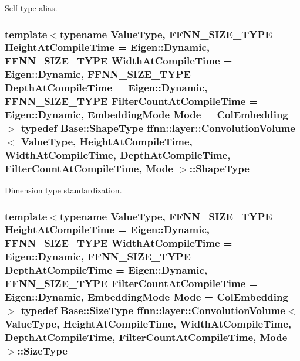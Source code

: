 Self type alias. 

\hypertarget{classffnn_1_1layer_1_1_convolution_volume_ae31080a107422dcfaff38eafadd69494}{
\subsubsection[{Shape\-Type}]{\setlength{\rightskip}{0pt plus 5cm}template$<$typename Value\-Type, F\-F\-N\-N\-\_\-\-S\-I\-Z\-E\-\_\-\-T\-Y\-P\-E Height\-At\-Compile\-Time = Eigen\-::\-Dynamic, F\-F\-N\-N\-\_\-\-S\-I\-Z\-E\-\_\-\-T\-Y\-P\-E Width\-At\-Compile\-Time = Eigen\-::\-Dynamic, F\-F\-N\-N\-\_\-\-S\-I\-Z\-E\-\_\-\-T\-Y\-P\-E Depth\-At\-Compile\-Time = Eigen\-::\-Dynamic, F\-F\-N\-N\-\_\-\-S\-I\-Z\-E\-\_\-\-T\-Y\-P\-E Filter\-Count\-At\-Compile\-Time = Eigen\-::\-Dynamic, Embedding\-Mode Mode = Col\-Embedding$>$ typedef {\bf Base\-::\-Shape\-Type} {\bf ffnn\-::layer\-::\-Convolution\-Volume}$<$ Value\-Type, Height\-At\-Compile\-Time, Width\-At\-Compile\-Time, Depth\-At\-Compile\-Time, Filter\-Count\-At\-Compile\-Time, Mode $>$\-::{\bf Shape\-Type}}}\label{classffnn_1_1layer_1_1_convolution_volume_ae31080a107422dcfaff38eafadd69494}


Dimension type standardization. 

\hypertarget{classffnn_1_1layer_1_1_convolution_volume_abddc276f0405f5c0d70de3e43c2824d9}{
\subsubsection[{Size\-Type}]{\setlength{\rightskip}{0pt plus 5cm}template$<$typename Value\-Type, F\-F\-N\-N\-\_\-\-S\-I\-Z\-E\-\_\-\-T\-Y\-P\-E Height\-At\-Compile\-Time = Eigen\-::\-Dynamic, F\-F\-N\-N\-\_\-\-S\-I\-Z\-E\-\_\-\-T\-Y\-P\-E Width\-At\-Compile\-Time = Eigen\-::\-Dynamic, F\-F\-N\-N\-\_\-\-S\-I\-Z\-E\-\_\-\-T\-Y\-P\-E Depth\-At\-Compile\-Time = Eigen\-::\-Dynamic, F\-F\-N\-N\-\_\-\-S\-I\-Z\-E\-\_\-\-T\-Y\-P\-E Filter\-Count\-At\-Compile\-Time = Eigen\-::\-Dynamic, Embedding\-Mode Mode = Col\-Embedding$>$ typedef {\bf Base\-::\-Size\-Type} {\bf ffnn\-::layer\-::\-Convolution\-Volume}$<$ Value\-Type, Height\-At\-Compile\-Time, Width\-At\-Compile\-Time, Depth\-At\-Compile\-Time, Filter\-Count\-At\-Compile\-Time, Mode $>$\-::{\bf Size\-Type}}}\label{classffnn_1_1layer_1_1_convolution_volume_abddc276f0405f5c0d70de3e43c2824d9}


